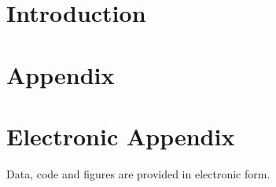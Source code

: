 \documentclass[12pt]{article}
\begin{document}
\tableofcontents
\newpage

\listoffigures
\newpage
\listoftables
\newpage


    
\section{Introduction}
\label{intro}
% 

\newpage

    


\setcounter{page}{5}

\appendix

\section{Appendix}
\label{app}
% 
\newpage

\section{Electronic Appendix}
\label{el_app}

Data, code and figures are provided in electronic form.

\newpage
    

\RaggedRight


\newpage

\end{document}
